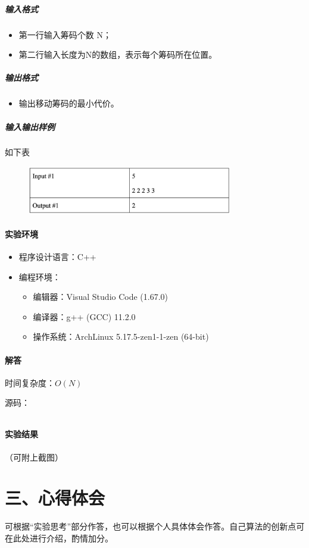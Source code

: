 \documentclass[12pt,a4paper]{ctexart}
\begin{document}
\subparagraph{输入格式}
    \begin{itemize}
        \item 第一行输入筹码个数 N；
        \item 第二行输入长度为N的数组，表示每个筹码所在位置。
    \end{itemize}

\subparagraph{输出格式}
    \begin{itemize}
        \item 输出移动筹码的最小代价。
    \end{itemize}
    

\subparagraph{输入输出样例}
如下表
    \begin{figure}[h]
        \centering
        \includegraphics[width=0.80\textwidth]{q3_iodata.png}
    \end{figure}

\vspace{5pt}

\paragraph{实验环境}
\begin{itemize}
    \item 程序设计语言：C++
    \item 编程环境：
    \begin{itemize}
        \item 编辑器：Visual Studio Code (1.67.0)
        \item 编译器：g++ (GCC) 11.2.0
        \item 操作系统：ArchLinux 5.17.5-zen1-1-zen (64-bit)
    \end{itemize}
\end{itemize}

\vspace{5pt}

\paragraph{解答} 时间复杂度：$O(N)$

源码：
\inputminted[bgcolor=codebg,frame=lines,autogobble,linenos=true,breaklines]{cpp}{src/t3.cpp}

\vspace{5pt}

\paragraph{实验结果}
（可附上截图）

\newpage

\section*{三、心得体会}
    可根据“实验思考”部分作答，也可以根据个人具体体会作答。自己算法的创新点可在此处进行介绍，酌情加分。
\end{document}

